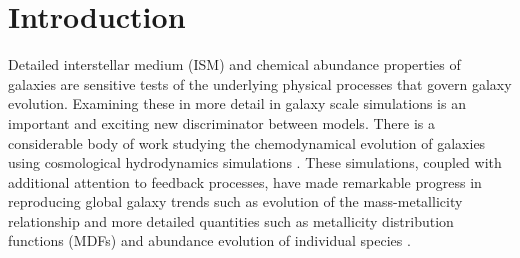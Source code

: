 \documentclass[twocolumn]{aastex61}
\begin{document}
\section{Introduction}
%
%
%

Detailed interstellar medium (ISM) and chemical abundance properties of galaxies are sensitive tests of the underlying physical processes that govern galaxy evolution. Examining these in more detail in galaxy scale simulations is an important and exciting new discriminator between models. There is a considerable body of work studying the chemodynamical evolution of galaxies using cosmological hydrodynamics simulations \citep[e.g.][]{Lia2002,KawataGibson2003,Kobayashi2004,Tornatore2004,Romeo2005,OppenheimerDave2008,Wiersma2009,Shen2010,MUGS2010,ErisSimulation,Brook2014,Snaith2015,Oppenheimer2016,OWLS,EAGLE,FIRE}. These simulations, coupled with additional attention to feedback processes, have made remarkable progress in reproducing global galaxy trends such as evolution of the mass-metallicity relationship \citep[e.g.][]{Obreja2014, Ma2016, Dave2017, Torrey2017} and more detailed quantities such as metallicity distribution functions (MDFs) and abundance evolution of individual species \citep{Marcolini2008,Revaz2009,Sawala2010,RevazJablonka2012,Jeon2017,Hirai2017} . 
\end{document}
